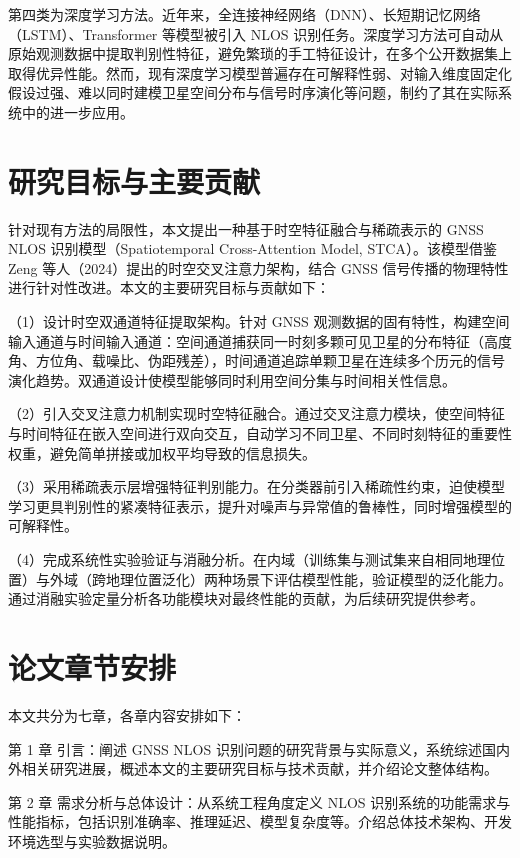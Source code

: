 第四类为深度学习方法。近年来，全连接神经网络（DNN）、长短期记忆网络（LSTM）、Transformer 等模型被引入 NLOS 识别任务。深度学习方法可自动从原始观测数据中提取判别性特征，避免繁琐的手工特征设计，在多个公开数据集上取得优异性能。然而，现有深度学习模型普遍存在可解释性弱、对输入维度固定化假设过强、难以同时建模卫星空间分布与信号时序演化等问题，制约了其在实际系统中的进一步应用。

\section{研究目标与主要贡献}

针对现有方法的局限性，本文提出一种基于时空特征融合与稀疏表示的 GNSS NLOS 识别模型（Spatiotemporal Cross-Attention Model, STCA）。该模型借鉴 Zeng 等人（2024）提出的时空交叉注意力架构，结合 GNSS 信号传播的物理特性进行针对性改进。本文的主要研究目标与贡献如下：

（1）设计时空双通道特征提取架构。针对 GNSS 观测数据的固有特性，构建空间输入通道与时间输入通道：空间通道捕获同一时刻多颗可见卫星的分布特征（高度角、方位角、载噪比、伪距残差），时间通道追踪单颗卫星在连续多个历元的信号演化趋势。双通道设计使模型能够同时利用空间分集与时间相关性信息。

（2）引入交叉注意力机制实现时空特征融合。通过交叉注意力模块，使空间特征与时间特征在嵌入空间进行双向交互，自动学习不同卫星、不同时刻特征的重要性权重，避免简单拼接或加权平均导致的信息损失。

（3）采用稀疏表示层增强特征判别能力。在分类器前引入稀疏性约束，迫使模型学习更具判别性的紧凑特征表示，提升对噪声与异常值的鲁棒性，同时增强模型的可解释性。

（4）完成系统性实验验证与消融分析。在内域（训练集与测试集来自相同地理位置）与外域（跨地理位置泛化）两种场景下评估模型性能，验证模型的泛化能力。通过消融实验定量分析各功能模块对最终性能的贡献，为后续研究提供参考。

\section{论文章节安排}

本文共分为七章，各章内容安排如下：

第 1 章 引言：阐述 GNSS NLOS 识别问题的研究背景与实际意义，系统综述国内外相关研究进展，概述本文的主要研究目标与技术贡献，并介绍论文整体结构。

第 2 章 需求分析与总体设计：从系统工程角度定义 NLOS 识别系统的功能需求与性能指标，包括识别准确率、推理延迟、模型复杂度等。介绍总体技术架构、开发环境选型与实验数据说明。

